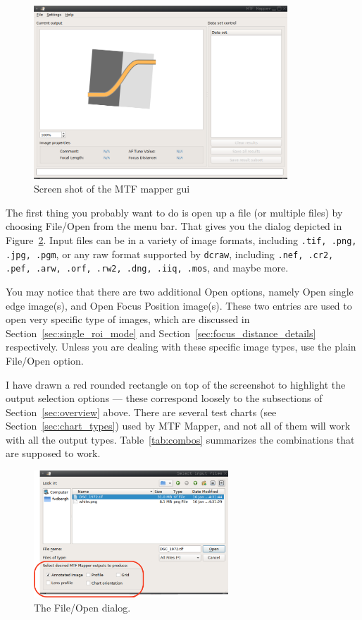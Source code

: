 \documentclass[a4paper]{article}
\begin{document}
\begin{figure}[hb!]
\centering
\includegraphics[width=0.85\textwidth]{figures/sshot1}
\caption{Screen shot of the MTF mapper gui}
\label{fig:sshot1}
\end{figure}


The first thing you probably want to do is open up a file (or multiple
files) by choosing \textsf{File/Open} from the menu bar. That gives you the
dialog depicted in Figure~\ref{fig:file_dialog}. Input files can be in a variety 
of image formats, including \texttt{.tif, .png, .jpg, .pgm}, 
or any raw format supported by \verb+dcraw+, including 
\texttt{.nef, .cr2, .pef, .arw, .orf, .rw2, .dng, .iiq, .mos}, and maybe more.

You may notice that there are two additional \textsf{Open} options, namely
\textsf{Open single edge image(s)}, and \textsf{Open Focus Position
image(s)}. These two entries are used to open very specific type of images,
which are discussed in Section~\ref{sec:single_roi_mode} and Section~\ref{sec:focus_distance_details}
respectively. Unless you are dealing with these specific image types, use
the plain \textsf{File/Open} option.

\newpage

I have drawn a red rounded rectangle on top of the screenshot to highlight
the output selection options --- these correspond loosely to the subsections
of Section~\ref{sec:overview} above.  There are several test charts (see
Section~\ref{sec:chart_types}) used by MTF Mapper, and not all of them will
work with all the output types.  Table~\ref{tab:combos} summarizes the
combinations that are supposed to work.

\begin{figure}[ht!]
\centering
\includegraphics[width=0.65\textwidth]{figures/file_dialog2}
\caption{The File/Open dialog.}
\label{fig:file_dialog}
\end{figure}
\end{document}
